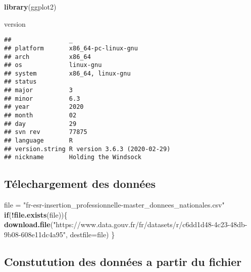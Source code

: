 \documentclass[
]{article}
\newenvironment{Shaded}{\begin{snugshade}}{\end{snugshade}}
\newcommand{\ControlFlowTok}[1]{\textcolor[rgb]{0.13,0.29,0.53}{\textbf{#1}}}
\newcommand{\DataTypeTok}[1]{\textcolor[rgb]{0.13,0.29,0.53}{#1}}
\newcommand{\KeywordTok}[1]{\textcolor[rgb]{0.13,0.29,0.53}{\textbf{#1}}}
\newcommand{\NormalTok}[1]{#1}
\newcommand{\OperatorTok}[1]{\textcolor[rgb]{0.81,0.36,0.00}{\textbf{#1}}}
\newcommand{\StringTok}[1]{\textcolor[rgb]{0.31,0.60,0.02}{#1}}
\begin{document}
\begin{Shaded}
\begin{Highlighting}[]
\KeywordTok{library}\NormalTok{(ggplot2)}

\NormalTok{version}
\end{Highlighting}
\end{Shaded}

\begin{verbatim}
##                _                           
## platform       x86_64-pc-linux-gnu         
## arch           x86_64                      
## os             linux-gnu                   
## system         x86_64, linux-gnu           
## status                                     
## major          3                           
## minor          6.3                         
## year           2020                        
## month          02                          
## day            29                          
## svn rev        77875                       
## language       R                           
## version.string R version 3.6.3 (2020-02-29)
## nickname       Holding the Windsock
\end{verbatim}

\hypertarget{section}{%
\subsection{}\label{section}}

\hypertarget{tuxe9lechargement-des-donnuxe9es}{%
\subsection{Télechargement des
données}\label{tuxe9lechargement-des-donnuxe9es}}

\begin{Shaded}
\begin{Highlighting}[]
\NormalTok{file =}\StringTok{ "fr-esr-insertion_professionnelle-master_donnees_nationales.csv"}
\ControlFlowTok{if}\NormalTok{(}\OperatorTok{!}\KeywordTok{file.exists}\NormalTok{(file))\{}
  \KeywordTok{download.file}\NormalTok{(}\StringTok{"https://www.data.gouv.fr/fr/datasets/r/c6dd1d48-4c23-48db-9b08-608e11dc4a95"}\NormalTok{,}
    \DataTypeTok{destfile=}\NormalTok{file)}
\NormalTok{\}}
\end{Highlighting}
\end{Shaded}

\hypertarget{constutution-des-donnuxe9es-a-partir-du-fichier}{%
\subsection{Constutution des données a partir du
fichier}\label{constutution-des-donnuxe9es-a-partir-du-fichier}}
\end{document}
